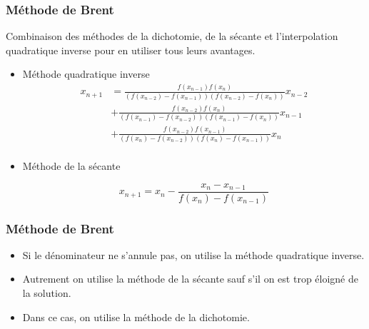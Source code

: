 \documentclass[french]{beamer}
\begin{document}

\begin{frame}
\frametitle{Méthode de Brent}

Combinaison des méthodes de la dichotomie, de la sécante et l'interpolation quadratique inverse pour en utiliser tous leurs avantages.

   \begin{itemize}
      \item Méthode quadratique inverse
    \begin{equation}\begin{aligned}
         x_{n+1} &= \frac{f(x_{n-1})f(x_n)}{(f(x_{n-2})-f(x_{n-1}))(f(x_{n-2})-f(x_{n}))}x_{n-2} \\
         &+  \frac{f(x_{n-2})f(x_n)}{(f(x_{n-1})-f(x_{n-2}))(f(x_{n-1})-f(x_{n}))}x_{n-1} \\
         &+ \frac{f(x_{n-2})f(x_{n-1})}{(f(x_{n})-f(x_{n-2}))(f(x_{n})-f(x_{n-1}))}x_{n} \\
    \end{aligned}
    \end{equation}  
     

     \item Méthode de la sécante

     \begin{equation}
        x_{n+1} = x_n - \frac{x_n - x_{n-1}}{f(x_n) - f(x_{n-1})}
     \end{equation}

   \end{itemize}
\end{frame}



\begin{frame}
\frametitle{Méthode de Brent}

   \begin{itemize}
      \item Si le dénominateur ne s'annule pas, on utilise la méthode quadratique inverse.
      \item Autrement on utilise la méthode de la sécante sauf s'il on est trop éloigné de la solution.
      \item Dans ce cas, on utilise la méthode de la dichotomie.
   \end{itemize}
\end{frame}


\end{document}
